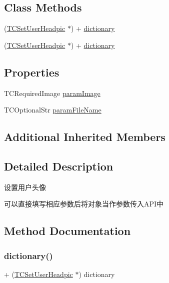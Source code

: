 \subsection*{Class Methods}
\begin{DoxyCompactItemize}
\item 
(\mbox{\hyperlink{interface_t_c_set_user_headpic}{T\+C\+Set\+User\+Headpic}} $\ast$) + \mbox{\hyperlink{interface_t_c_set_user_headpic_a39b252ac5b943828138ee0e1cee5a132}{dictionary}}
\item 
(\mbox{\hyperlink{interface_t_c_set_user_headpic}{T\+C\+Set\+User\+Headpic}} $\ast$) + \mbox{\hyperlink{interface_t_c_set_user_headpic_a39b252ac5b943828138ee0e1cee5a132}{dictionary}}
\end{DoxyCompactItemize}
\subsection*{Properties}
\begin{DoxyCompactItemize}
\item 
T\+C\+Required\+Image \mbox{\hyperlink{interface_t_c_set_user_headpic_ade9c0ca010bf4b820d1e9007f65523dd}{param\+Image}}
\item 
T\+C\+Optional\+Str \mbox{\hyperlink{interface_t_c_set_user_headpic_ae0b98da92efdbac9be9d97558540523a}{param\+File\+Name}}
\end{DoxyCompactItemize}
\subsection*{Additional Inherited Members}


\subsection{Detailed Description}
设置用户头像 

可以直接填写相应参数后将对象当作参数传入\+A\+P\+I中 

\subsection{Method Documentation}
\mbox{\label{interface_t_c_set_user_headpic_a39b252ac5b943828138ee0e1cee5a132}} 
\subsubsection{\texorpdfstring{dictionary()}{dictionary()}\hspace{0.1cm}{\footnotesize\ttfamily [1/2]}}
{\footnotesize\ttfamily + (\mbox{\hyperlink{interface_t_c_set_user_headpic}{T\+C\+Set\+User\+Headpic}} $\ast$) dictionary \begin{DoxyParamCaption}{ }\end{DoxyParamCaption}}

